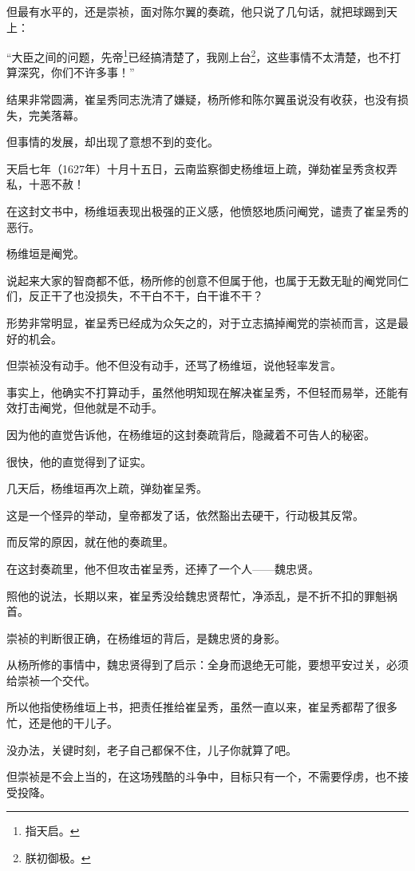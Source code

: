 \begin{multicols}{\theparacolNo}
		但最有水平的，还是崇祯，面对陈尔翼的奏疏，他只说了几句话，就把球踢到天上：

		“大臣之间的问题，先帝\footnote{指天启。}已经搞清楚了，我刚上台\footnote{朕初御极。}，这些事情不太清楚，也不打算深究，你们不许多事！”

		结果非常圆满，崔呈秀同志洗清了嫌疑，杨所修和陈尔翼虽说没有收获，也没有损失，完美落幕。

		但事情的发展，却出现了意想不到的变化。

		天启七年（1627年）十月十五日，云南监察御史杨维垣上疏，弹劾崔呈秀贪权弄私，十恶不赦！

		在这封文书中，杨维垣表现出极强的正义感，他愤怒地质问阉党，谴责了崔呈秀的恶行。

		杨维垣是阉党。

		说起来大家的智商都不低，杨所修的创意不但属于他，也属于无数无耻的阉党同仁们，反正干了也没损失，不干白不干，白干谁不干？

		形势非常明显，崔呈秀已经成为众矢之的，对于立志搞掉阉党的崇祯而言，这是最好的机会。

		但崇祯没有动手。他不但没有动手，还骂了杨维垣，说他轻率发言。

		事实上，他确实不打算动手，虽然他明知现在解决崔呈秀，不但轻而易举，还能有效打击阉党，但他就是不动手。

		因为他的直觉告诉他，在杨维垣的这封奏疏背后，隐藏着不可告人的秘密。

		很快，他的直觉得到了证实。

		几天后，杨维垣再次上疏，弹劾崔呈秀。

		这是一个怪异的举动，皇帝都发了话，依然豁出去硬干，行动极其反常。

		而反常的原因，就在他的奏疏里。

		在这封奏疏里，他不但攻击崔呈秀，还捧了一个人——魏忠贤。

		照他的说法，长期以来，崔呈秀没给魏忠贤帮忙，净添乱，是不折不扣的罪魁祸首。

		崇祯的判断很正确，在杨维垣的背后，是魏忠贤的身影。

		从杨所修的事情中，魏忠贤得到了启示：全身而退绝无可能，要想平安过关，必须给崇祯一个交代。

		所以他指使杨维垣上书，把责任推给崔呈秀，虽然一直以来，崔呈秀都帮了很多忙，还是他的干儿子。

		没办法，关键时刻，老子自己都保不住，儿子你就算了吧。

		但崇祯是不会上当的，在这场残酷的斗争中，目标只有一个，不需要俘虏，也不接受投降。
		\ifnum{}
	\end{multicols}
\fi
\newpage
